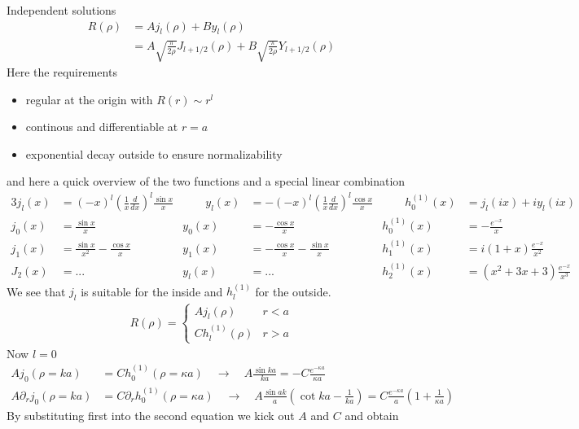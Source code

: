 \documentclass[../main.tex]{subfiles}
\begin{document}
Independent solutions
\begin{align}
R(\rho)
&=Aj_l(\rho)+By_l(\rho)\\
&=A\sqrt{\frac{\pi}{2\rho}}J_{l+1/2}(\rho)+B\sqrt{\frac{\pi}{2\rho}}Y_{l+1/2}(\rho)
\end{align}
Here the requirements
\begin{itemize}
\item regular at the origin with $R(r)\sim r^l$
\item continous and differentiable at $r=a$
\item exponential decay outside to ensure normalizability
\end{itemize}
and here a quick overview of the two functions and a special linear combination
\begin{alignat*}{3}
j_l(x)&=(-x)^l\left(\frac{1}{x}\frac{d}{dx}\right)^l\frac{\sin x}{x} & \qquad y_l(x)&=-(-x)^l\left(\frac{1}{x}\frac{d}{dx}\right)^l\frac{\cos x}{x} &\qquad  h^{(1)}_0(x)&=j_l(ix)+iy_l(ix)\\
j_0(x)&=\frac{\sin x}{x}                                             & y_0(x)&=-\frac{\cos x}{x}                    & h^{(1)}_0(x)&=-\frac{e^{-x}}{x}\\
j_1(x)&=\frac{\sin x}{x^2}-\frac{\cos x}{x}                          & y_1(x)&=-\frac{\cos x}{x}-\frac{\sin x}{x}   & h^{(1)}_1(x)&=i(1+x)\frac{e^{-x}}{x^2}\\
J_2(x)&=...                                                          & y_l(x)&=...                                  & h^{(1)}_2(x)&=(x^2+3x+3)\frac{e^{-x}}{x^3} 
\end{alignat*} 
We see that $j_l$ is suitable for the inside and $h^{(1)}_l$ for the outside.
\begin{align}
R(\rho)=\left\{\begin{matrix}
Aj_l(\rho) & r<a\\
Ch^{(1)}_l(\rho) & r>a
\end{matrix}\right.
\end{align}
Now $l=0$
\begin{align}
Aj_0(\rho=ka)&=Ch^{(1)}_0(\rho=\kappa a)\quad\rightarrow\quad A\frac{\sin ka}{ka}=-C\frac{e^{-\kappa a}}{\kappa a}\\
A\partial_r j_0(\rho=ka)&=C\partial_r h^{(1)}_0(\rho=\kappa a)\quad\rightarrow\quad 
%
A\frac{\sin ak}{a}\left(\cot ka-\frac{1}{ka}\right)=C\frac{e^{-\kappa a}}{a}\left(1+\frac{1}{\kappa a}\right)
\end{align}
By substituting first into the second equation we kick out $A$ and $C$ and obtain
\end{document}
